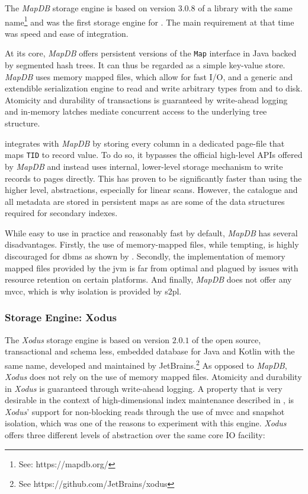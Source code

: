 The \emph{MapDB} storage engine is based on version $3.0.8$ of a library with the same name\footnote{See: https://mapdb.org/} and was the first storage engine for \cottontail{}. The main requirement at that time was speed and ease of integration.

At its core, \emph{MapDB} offers persistent versions of the \texttt{Map} interface in Java backed by segmented hash trees. It can thus be regarded as a simple key-value store. \emph{MapDB} uses memory mapped files, which allow for fast I/O, and a generic and extendible serialization engine to read and write arbitrary types from and to disk. Atomicity and durability of transactions is guaranteed by write-ahead logging and in-memory latches mediate concurrent access to the underlying tree structure.

\cottontail{} integrates with \emph{MapDB} by storing every column in a dedicated page-file that maps \texttt{TID} to record value. To do so, it bypasses the official high-level APIs offered by \emph{MapDB} and instead uses internal, lower-level storage mechanism to write records to pages directly. This has proven to be significantly faster than using the higher level, abstractions, especially for linear scans. However, the catalogue and all metadata are stored in persistent maps as are some of the data structures required for secondary indexes.

While easy to use in practice and reasonably fast by default, \emph{MapDB} has several disadvantages. Firstly, the use of memory-mapped files, while tempting, is highly discouraged for \acrshort{dbms} as shown by \cite{Crotty:2022Are}. Secondly, the implementation of memory mapped files provided by the \acrshort{jvm} is far from optimal and plagued by issues with resource retention on certain platforms. And finally, \emph{MapDB} does not offer any \acrshort{mvcc}, which is why isolation is provided by \acrshort{s2pl}.

\subsubsection{Storage Engine: Xodus}
The \emph{Xodus} storage engine is based on version $2.0.1$ of the open source, transactional and schema less, embedded database for Java and Kotlin with the same name, developed and maintained by JetBrains.\footnote{See https://github.com/JetBrains/xodus} As opposed to \emph{MapDB}, \emph{Xodus} does not rely on the use of memory mapped files. Atomicity and durability in \emph{Xodus} is guaranteed through write-ahead logging. A property that is very desirable in the context of high-dimensional index maintenance described in , is \emph{Xodus}' support for non-blocking reads through the use of \acrshort{mvcc} and snapshot isolation, which was one of the reasons to experiment with this engine. \emph{Xodus} offers three different levels of abstraction over the same core IO facility:

